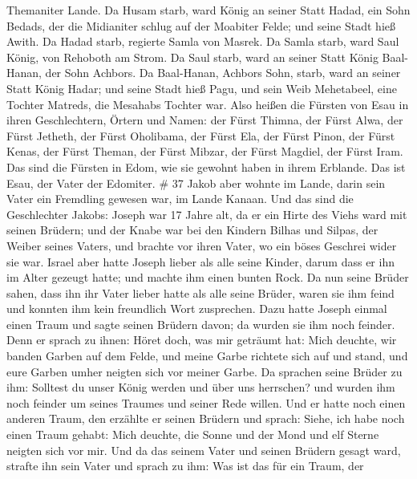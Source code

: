 Themaniter Lande.  Da Husam starb, ward König an seiner
Statt Hadad, ein Sohn Bedads, der die Midianiter schlug auf der Moabiter
Felde; und seine Stadt hieß Awith.  Da Hadad starb,
regierte Samla von Masrek.  Da Samla starb, ward Saul
König, von Rehoboth am Strom.  Da Saul starb, ward an
seiner Statt König Baal-Hanan, der Sohn Achbors.  Da
Baal-Hanan, Achbors Sohn, starb, ward an seiner Statt König Hadar; und
seine Stadt hieß Pagu, und sein Weib Mehetabeel, eine Tochter Matreds,
die Mesahabs Tochter war.  Also heißen die Fürsten von
Esau in ihren Geschlechtern, Örtern und Namen: der Fürst Thimna, der
Fürst Alwa, der Fürst Jetheth,  der Fürst Oholibama, der
Fürst Ela, der Fürst Pinon,  der Fürst Kenas, der Fürst
Theman, der Fürst Mibzar,  der Fürst Magdiel, der Fürst
Iram. Das sind die Fürsten in Edom, wie sie gewohnt haben in ihrem
Erblande. Das ist Esau, der Vater der Edomiter. \# 37 
Jakob aber wohnte im Lande, darin sein Vater ein Fremdling gewesen war,
im Lande Kanaan.  Und das sind die Geschlechter Jakobs:
Joseph war 17 Jahre alt, da er ein Hirte des Viehs ward mit seinen
Brüdern; und der Knabe war bei den Kindern Bilhas und Silpas, der Weiber
seines Vaters, und brachte vor ihren Vater, wo ein böses Geschrei wider
sie war.  Israel aber hatte Joseph lieber als alle seine
Kinder, darum dass er ihn im Alter gezeugt hatte; und machte ihm einen
bunten Rock.  Da nun seine Brüder sahen, dass ihn ihr
Vater lieber hatte als alle seine Brüder, waren sie ihm feind und
konnten ihm kein freundlich Wort zusprechen.  Dazu hatte
Joseph einmal einen Traum und sagte seinen Brüdern davon; da wurden sie
ihm noch feinder.  Denn er sprach zu ihnen: Höret doch,
was mir geträumt hat:  Mich deuchte, wir banden Garben auf
dem Felde, und meine Garbe richtete sich auf und stand, und eure Garben
umher neigten sich vor meiner Garbe.  Da sprachen seine
Brüder zu ihm: Solltest du unser König werden und über uns herrschen?
und wurden ihm noch feinder um seines Traumes und seiner Rede willen.
 Und er hatte noch einen anderen Traum, den erzählte er
seinen Brüdern und sprach: Siehe, ich habe noch einen Traum gehabt: Mich
deuchte, die Sonne und der Mond und elf Sterne neigten sich vor mir.
 Und da das seinem Vater und seinen Brüdern gesagt ward,
strafte ihn sein Vater und sprach zu ihm: Was ist das für ein Traum, der

